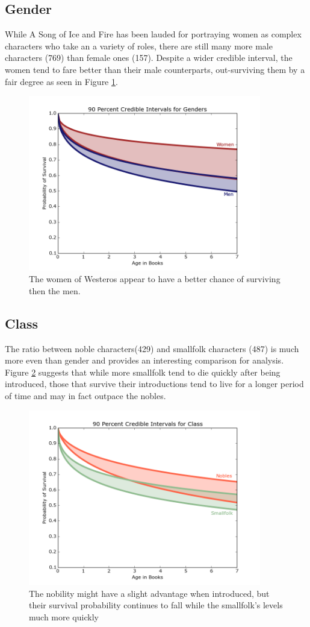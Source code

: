 \documentclass{article}
\begin{document}
\subsection{Gender}
While A Song of Ice and Fire has been lauded for portraying women as complex characters who take an a variety of roles, there are still many more male characters (769) than female ones (157). Despite a wider credible interval, the women tend to fare better than their male counterparts, out-surviving them by a fair degree as seen in Figure \ref{fig:gender}.
\newpage
\begin{figure}[ht!]
\centering
\includegraphics[width=4in]{Gender.png}
\caption{The women of Westeros appear to have a better chance of surviving then the men.}
\label{fig:gender}
\end{figure}

\subsection{Class}
The ratio between noble characters(429) and smallfolk characters (487) is much more even than gender and provides an interesting comparison for analysis. Figure \ref{fig:class} suggests that while more smallfolk tend to die quickly after being introduced, those that survive their introductions tend to live for a longer period of time and may in fact outpace the nobles.

\begin{figure}[ht!]
\centering
\includegraphics[width=4in]{Class.png}
\caption{The nobility might have a slight advantage when introduced, but their survival probability continues to fall while the smallfolk's levels much more quickly}
\label{fig:class}
\end{figure}
\end{document}
